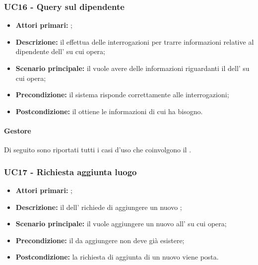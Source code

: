 \documentclass[../analisi-dei-requisiti]{subfiles}
\begin{document}
\subsubsection{UC16 - Query sul dipendente}
\label{subsub:UC16}

\begin{itemize}
\item \textbf{Attori primari:} ;
\item \textbf{Descrizione:} il  effettua delle interrogazioni per trarre informazioni relative al dipendente dell' su cui opera;
\item \textbf{Scenario principale:} il  vuole avere delle informazioni riguardanti il dell' su cui opera;
\item \textbf{Precondizione:} il sistema risponde correttamente alle interrogazioni;
\item \textbf{Postcondizione:} il  ottiene le informazioni di cui ha bisogno.

\end{itemize}

\paragraph{Gestore}
Di seguito sono riportati tutti i casi d'uso che coinvolgono il  .

\subsubsection{UC17 - Richiesta aggiunta luogo}
\label{subsub:UC17}

\begin{itemize}
\item \textbf{Attori primari:} ;
\item \textbf{Descrizione:} il  dell' richiede di aggiungere un nuovo ;
\item \textbf{Scenario principale:} il  vuole aggiungere un nuovo  all' su cui opera;
\item \textbf{Precondizione:} il  da aggiungere non deve già esistere;
\item \textbf{Postcondizione:} la richiesta di aggiunta di un nuovo  viene posta.

\end{itemize}
\end{document}
